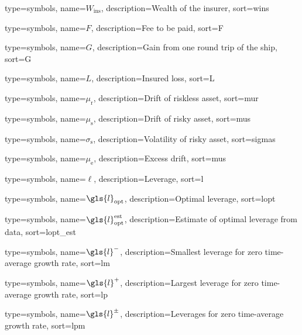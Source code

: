 {
  type={symbols}, 
  name={\ensuremath{W_{\text{ins}}}},
  description={Wealth of the insurer},
  sort=wins
}


{
  type={symbols}, 
  name={\ensuremath{F}},
  description={Fee to be paid},
  sort=F
}

{
  type={symbols}, 
  name={\ensuremath{G}},
  description={Gain from one round trip of the ship},
  sort=G
}

{
  type={symbols}, 
  name={\ensuremath{L}},
  description={Insured loss},
  sort=L
}


{
  type={symbols}, 
  name={\ensuremath{\mu_\text{r}}},
  description={Drift of riskless asset},
  sort=mur
}

{
  type={symbols}, 
  name={\ensuremath{\mu_\text{s}}},
  description={Drift of risky asset},
  sort=mus
}

{
  type={symbols}, 
  name={\ensuremath{\sigma_\text{s}}},
  description={Volatility of risky asset},
  sort=sigmas
}

{
  type={symbols}, 
  name={\ensuremath{\mu_\text{e}}},
  description={Excess drift},
  sort=mus
}

{
  type={symbols}, 
  name={\ensuremath{\ell}},
  description={Leverage},
  sort=l
}

{
  type={symbols}, 
  name={\ensuremath{\gls{l}_\text{opt}}},
  description={Optimal leverage},
  sort=lopt
}

{
  type={symbols}, 
  name={\ensuremath{\gls{l}_\text{opt}^\text{est}}},
  description={Estimate of optimal leverage from data},
  sort=lopt_est
}

{
  type={symbols}, 
  name={\ensuremath{\gls{l}^{-}}},
  description={Smallest leverage for zero time-average growth rate},
  sort=lm
}

{
  type={symbols}, 
  name={\ensuremath{\gls{l}^{+}}},
  description={Largest leverage for zero time-average growth rate},
  sort=lp
}

{
  type={symbols}, 
  name={\ensuremath{\gls{l}^{\pm}}},
  description={Leverages for zero time-average growth rate},
  sort=lpm
}

